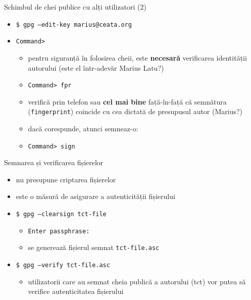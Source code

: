 \documentclass{beamer}
\begin{document}
\begin{frame}{Schimbul de chei publice cu alți utilizatori (2)}
  \begin{itemize}
    \item \texttt{\$ gpg --edit-key marius@ceata.org}
    \item \texttt{Command> }
    \begin{itemize}
      \item pentru siguranță în folosirea cheii, este \textbf{necesară}
      verificarea identității autorului (este el într-adevăr Marius Latu?)
      \item \texttt{Command> fpr}
      \item verifică prin telefon sau \textbf{cel mai bine} față-în-față că
      semnătura (\texttt{fingerprint}) coincide cu cea dictată de presupusul
      autor (Marius?)
      \item dacă corespunde, atunci semneaz-o:
      \item \texttt{Command> sign}
    \end{itemize}
  \end{itemize}
\end{frame}

\begin{frame}{Semnarea și verificarea fișierelor}
  \begin{itemize}
    \item nu presupune criptarea fișierelor
    \item este o măsură de asigurare a autenticității fișierului
    \item \texttt{\$ gpg --clearsign tct-file}
    \begin{itemize}
      \item \texttt{Enter passphrase: }
      \item se generează fișierul semnat \texttt{tct-file.asc}
    \end{itemize}
    \item \texttt{\$ gpg --verify tct-file.asc}
    \begin{itemize}
      \item utilizatorii care au semnat cheia publică a autorului (tct) vor 
      putea să verifice autenticitatea fișierului
    \end{itemize}
  \end{itemize}
\end{frame}
\end{document}
